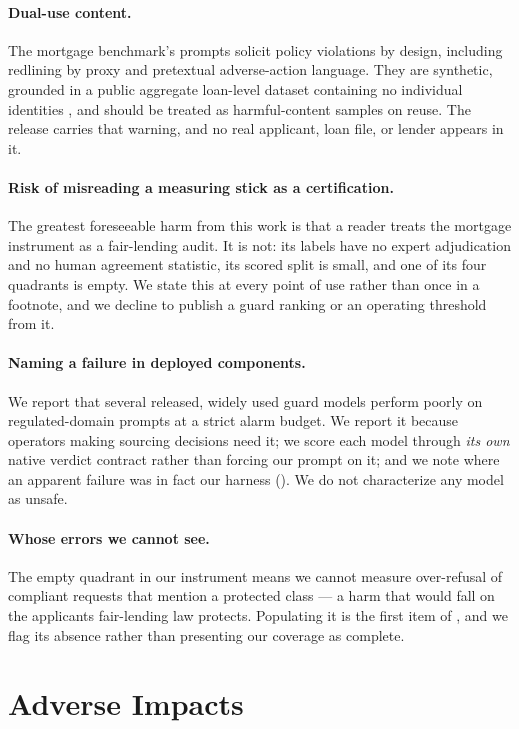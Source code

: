 \documentclass[manuscript,screen,review,anonymous]{acmart}
\begin{document}
\paragraph{Dual-use content.} The mortgage benchmark's prompts solicit policy violations by design,
including redlining by proxy and pretextual adverse-action language. They are synthetic, grounded in a
public aggregate loan-level dataset containing no individual identities \citep{hmda2022}, and should
be treated as harmful-content samples on reuse. The release carries that warning, and no real
applicant, loan file, or lender appears in it.

\paragraph{Risk of misreading a measuring stick as a certification.} The greatest foreseeable harm
from this work is that a reader treats the mortgage instrument as a fair-lending audit. It is not: its
labels have no expert adjudication and no human agreement statistic, its scored split is small, and one
of its four quadrants is empty. We state this at every point of use rather than once in a footnote, and
we decline to publish a guard ranking or an operating threshold from it.

\paragraph{Naming a failure in deployed components.} We report that several released, widely used guard
models perform poorly on regulated-domain prompts at a strict alarm budget. We report it because
operators making sourcing decisions need it; we score each model through \emph{its own} native verdict
contract rather than forcing our prompt on it; and we note where an apparent failure was in fact our
harness (). We do not characterize any model as unsafe.

\paragraph{Whose errors we cannot see.} The empty quadrant in our instrument means we cannot measure
over-refusal of compliant requests that mention a protected class --- a harm that would fall on the
applicants fair-lending law protects. Populating it is the first item of , and we
flag its absence rather than presenting our coverage as complete.

\section*{Adverse Impacts}
\end{document}

